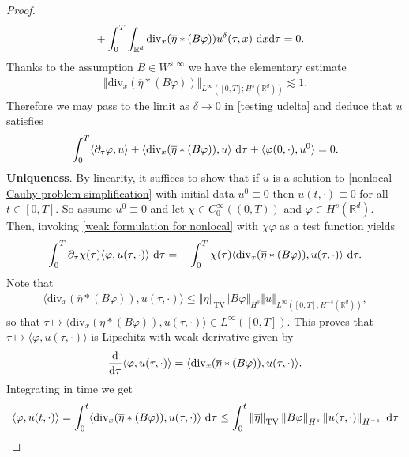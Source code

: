 \documentclass[11pt,reqno]{amsart}
\numberwithin{equation}{section}
\def\dd{{\rm d}}
\begin{document}
\begin{proof}
\begin{align}
&+\int_{0}^{T}\int_{\mathbb{R}^{d}}\mathrm{div}_{x}(\overline{\eta}\ast (B\varphi))u^{\delta}(\tau,x)\ \dd x\dd \tau=0. \label{testing udelta}   
\end{align}
Thanks to the assumption $B\in W^{s,\infty}$ we have the elementary estimate 
\begin{align*}
\left\Vert  \mathrm{div}_{x}(\overline{\eta}\ast (B\varphi)) \right\Vert_{L^{\infty}([0,T];H^{s}(\mathbb{R}^{d}))}\lesssim 1.       
\end{align*}
Therefore we may pass to the limit as $\delta \rightarrow 0$ in \eqref{testing udelta} and deduce that $u$ satisfies 
\begin{align*}
\int_{0}^{T}\langle \partial_{\tau}\varphi,u\rangle+\langle \mathrm{div}_{x}(\overline{\eta}\ast (B\varphi)),u\rangle\ \dd \tau+ \langle \varphi(0,\cdot ),u^{0}\rangle=0.         
\end{align*}
\textbf{Uniqueness}. By linearity, it suffices to show that if $u$ is a solution to \eqref{nonlocal Cauhy problem simplification} with initial data $u^{0}\equiv 0$ then $u(t,\cdot)\equiv 0$ for all $t\in [0,T]$. So assume $u^{0}\equiv0$ and let $\chi\in C^{\infty}_{0}((0,T))$ and $\varphi\in H^{s}(\mathbb{R}^{d})$. 
Then, invoking \eqref{weak formulation for nonlocal} with $\chi\varphi$ as a test function yields 
\begin{align*}
\int_{0}^{T}\partial_{\tau}\chi(\tau)\langle \varphi,u(\tau,\cdot)\rangle\ \dd \tau=-\int_{0}^{T}\chi(\tau)\langle \mathrm{div}_{x}(\overline{\eta}\ast (B\varphi)), u(\tau,\cdot) \rangle\ \dd \tau.  \end{align*}
Note that 
\begin{align*}
\langle \mathrm{div}_{x}(\overline{\eta}\ast (B\varphi)), u(\tau,\cdot) \rangle\leq \left\Vert \eta\right\Vert_{\mathrm{TV}}\left\Vert B\varphi\right\Vert_{H^{s}}  \left\Vert u\right\Vert_{L^{\infty}([0,T];H
^{-s}(\mathbb{R}^{d}))},  
\end{align*}
so that $\tau\mapsto \langle \mathrm{div}_{x}(\overline{\eta}\ast (B\varphi)), u(\tau,\cdot) \rangle \in L^{\infty}([0,T])$. 
 This proves that $\tau\mapsto \langle \varphi,u(\tau,\cdot)\rangle$ is Lipschitz with weak derivative given by 
\begin{align*}
\frac{\dd}{\dd \tau}\langle \varphi,u(\tau,\cdot)\rangle= \langle \mathrm{div}_{x}(\overline{\eta}\ast (B\varphi)),u(\tau,\cdot)\rangle.     
\end{align*}
Integrating in time we get 
\begin{align*}
\langle \varphi,u(t,\cdot)\rangle&=\int_{0}^{t}\langle \mathrm{div}_{x}(\overline{\eta}\ast (B\varphi)), u(\tau,\cdot)\rangle\ \dd \tau\leq \int_{0}^{t}\left\Vert \overline{\eta}\right\Vert_{\mathrm{TV}}\left\Vert B\varphi\right\Vert_{H^{s}}\left\Vert u(\tau,\cdot)\right\Vert_{H^{-s}}\ \dd \tau\\

\end{align*}
\end{proof}
\end{document}
